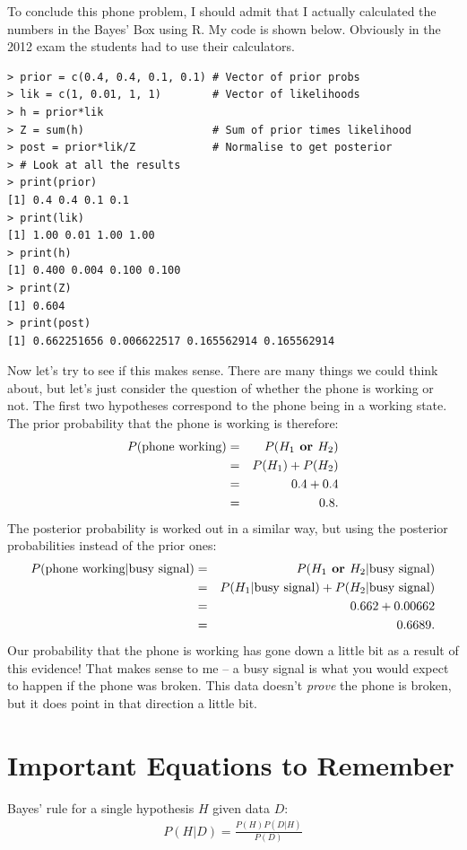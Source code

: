 To conclude this phone problem, I should admit that
I actually calculated the numbers in the Bayes' Box using R. My code is shown
below. Obviously in the
2012 exam the students had to use their calculators.
\begin{framed}
\begin{verbatim}
> prior = c(0.4, 0.4, 0.1, 0.1) # Vector of prior probs
> lik = c(1, 0.01, 1, 1)        # Vector of likelihoods
> h = prior*lik
> Z = sum(h)                    # Sum of prior times likelihood
> post = prior*lik/Z            # Normalise to get posterior
> # Look at all the results
> print(prior)
[1] 0.4 0.4 0.1 0.1
> print(lik)
[1] 1.00 0.01 1.00 1.00
> print(h)
[1] 0.400 0.004 0.100 0.100
> print(Z)
[1] 0.604
> print(post)
[1] 0.662251656 0.006622517 0.165562914 0.165562914
\end{verbatim}
\end{framed}
Now let's try to see if this makes sense. There are many things we could think
about, but let's just consider the question of whether
the phone is working or not. The first two hypotheses correspond to the phone
being in a working state. The prior probability that the phone is working is
therefore:
\begin{eqnarray}
P(\textnormal{phone working}) &=& P(H_1 \textbf{ or } H_2)\\
&=& P(H_1) + P(H_2)\\
&=& 0.4 + 0.4\\
&=& 0.8.
\end{eqnarray}
The posterior probability is worked out in a similar way, but using the posterior
probabilities instead of the prior ones:
\begin{eqnarray}
P(\textnormal{phone working}|\textnormal{busy signal}) &=& P(H_1 \textbf{ or } H_2 | \textnormal{busy signal})\\
&=& P(H_1|\textnormal{busy signal}) + P(H_2|\textnormal{busy signal})\\
&=& 0.662 + 0.00662\\
&=& 0.6689.
\end{eqnarray}
Our probability that the phone is working has gone down a little bit as a result of this
evidence! That makes sense to me -- a busy signal is what you would expect to
happen if the phone was broken. This data doesn't {\it prove} the phone is
broken, but it does point in that direction a little bit.

\section{Important Equations to Remember}
Bayes' rule for a single hypothesis $H$ given data $D$:
\begin{eqnarray}
P(H|D) = \frac{P(H)P(D|H)}{P(D)}
\end{eqnarray}

